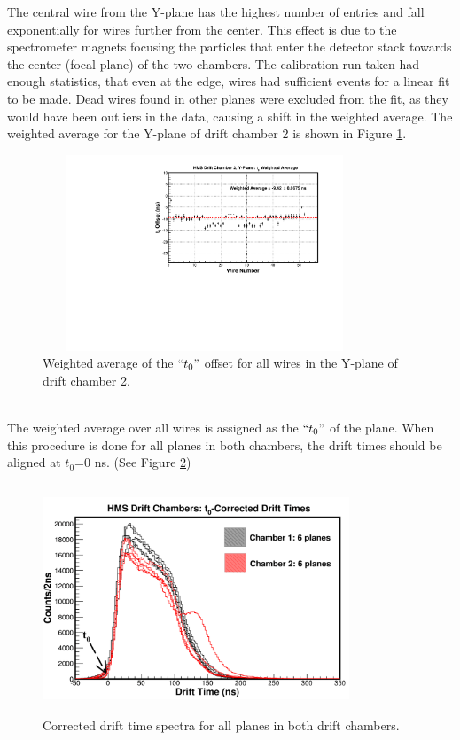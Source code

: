 \documentclass[journal, a4paper]{IEEEtran}
\begin{document}
The central wire from the Y-plane has the highest number of entries and fall exponentially for wires further from the
center. This effect is due to the spectrometer magnets focusing the particles that enter the detector stack towards
the center (focal plane) of the two chambers.
The calibration run taken had enough statistics, that even at the edge, wires had sufficient events for a linear
fit to be made. Dead wires found in other planes were excluded from the fit, as they would have been outliers in
the data, causing a shift in the weighted average. The weighted average for the Y-plane of drift chamber 2 is shown
in Figure \ref{fig:hdc2y1_wght_avg}.
\begin{figure}[!ht]
  \centering
  \includegraphics[width=3.8in, height=2.3in]{hdc2y1_wght_avg.pdf}
  \caption{Weighted average of the $``t_{0}"$ offset for all wires in the Y-plane of drift chamber 2.}
  \label{fig:hdc2y1_wght_avg}
\end{figure}\\
\indent The weighted average over all wires is assigned as the $``t_{0}"$ of the plane. When this procedure is done for all planes
in both chambers, the drift times should be aligned at $t_{0}$=0 ns. (See Figure \ref{fig:t0_corr})
\begin{figure}[!ht]
  \centering
  \includegraphics[width=3.6in, height=2.7in]{t0_corr_times.pdf}
  \caption{Corrected drift time spectra for all planes in both drift chambers.}
  \label{fig:t0_corr}
\end{figure}\\
\end{document}
